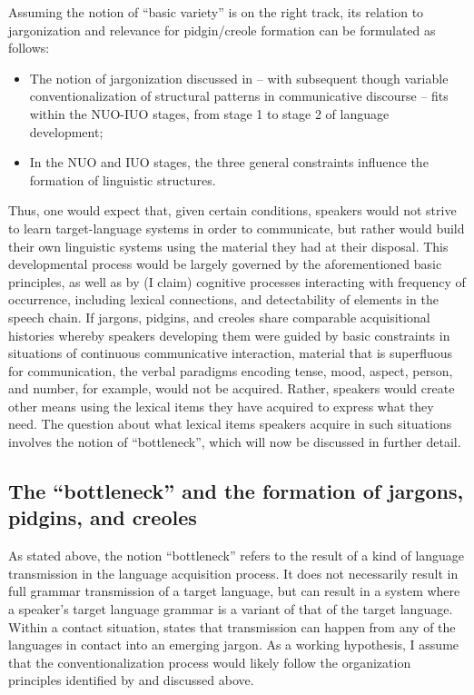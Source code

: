 \documentclass[output=paper,colorlinks,citecolor=brown]{langscibook}
\begin{document}
Assuming the notion of “basic variety” is on the right track, its relation to jargonization and relevance for pidgin/creole formation can be formulated as follows:

\begin{itemize}
    \item The notion of jargonization discussed in \citet{Good2012} – with subsequent though variable conventionalization of structural patterns in communicative discourse – fits within the NUO-IUO stages, from stage 1 to stage 2 of language development;
    \item In the NUO and IUO stages, the three general constraints influence the formation of linguistic structures.
\end{itemize}

\begin{sloppypar}
Thus, one would expect that, given certain conditions, speakers would not strive to learn target-language systems in order to communicate, but rather would build their own linguistic systems using the material they had at their disposal. This developmental process would be largely governed by the aforementioned basic principles, as well as by (I claim) cognitive processes interacting with frequency of occurrence, including lexical connections, and detectability of elements in the speech chain. If jargons, pidgins, and creoles share comparable acquisitional histories whereby speakers developing them were guided by basic constraints in situations of continuous communicative interaction, material that is superfluous for communication, the verbal paradigms encoding tense, mood, aspect, person, and number, for example, would not be acquired. Rather, speakers would create other means using the lexical items they have acquired to express what they need. The question about what lexical items speakers acquire in such situations involves the notion of “bottleneck”, which will now be discussed in further detail.
\end{sloppypar}

\subsection{The “bottleneck” and the formation of jargons, pidgins, and creoles}

As stated above, the notion “bottleneck” refers to the result of a kind of language transmission in the language acquisition process. It does not necessarily result in full grammar transmission of a target language, but can result in a system where a speaker's target language grammar is a variant of that of the target language. Within a contact situation, \citet[6]{Good2012} states that transmission can happen from any of the languages in contact into an emerging jargon. As a working hypothesis, I assume that the conventionalization process would likely follow the organization principles identified by \citet{KleinPerdue1992, KleinPerdue1997} and discussed above.
\end{document}
